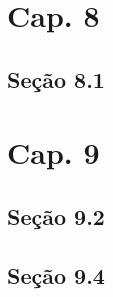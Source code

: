 \documentclass[letterpaper]{report}
\begin{document}
    \chapter*{Cap. 8}
    \section*{Seção 8.1}
    

    \chapter*{Cap. 9}
    \section*{Seção 9.2}
    
    
    
    \section*{Seção 9.4}
    
\end{document}
